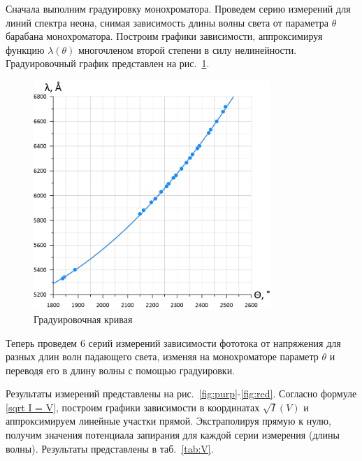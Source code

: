 \documentclass[a4paper, 12pt]{article}
\begin{document}
Сначала выполним градуировку монохроматора. Проведем серию измерений для линий спектра неона, снимая зависимость длины волны света от параметра $ \theta $ барабана монохроматора. Построим графики зависимости, аппроксимируя функцию $ \lambda (\theta) $ многочленом второй степени в силу нелинейности. Градуировочный график представлен на рис.~\ref{plot:calibr}.

\begin{figure}[h]
\begin{center}
\includegraphics[width = 0.8\textwidth]{calibr.png}
\caption{Градуировочная кривая}
\label{plot:calibr}
\end{center}
\end{figure}

Теперь проведем 6 серий измерений зависимости фототока от напряжения для разных длин волн падающего света, изменяя на монохроматоре параметр $ \theta $ и переводя его в длину волны с помощью градуировки.
	
Результаты измерений представлены на рис.~\ref{fig:purp}-\ref{fig:red}. Согласно формуле \eqref{sqrt I = V}, построим графики зависимости в координатах $ \sqrt{I} (V) $ и аппроксимируем линейные участки прямой. Экстраполируя прямую к нулю, получим значения потенциала запирания для каждой серии измерения (длины волны). Результаты представлены в таб.~\ref{tab:V}.
\end{document}
